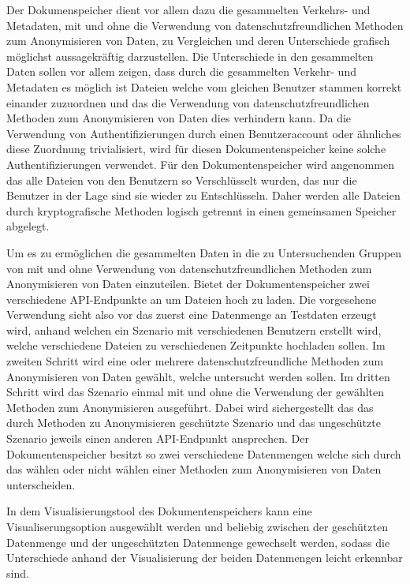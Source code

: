 \documentclass[
    fontsize=12pt,
    headings=small,
    parskip=half,           %
    bibliography=totoc,
    numbers=noenddot,       %
    open=any,               %
    ]{scrreprt}
\begin{document}
Der Dokumenspeicher dient vor allem dazu die gesammelten Verkehrs- und Metadaten, mit und ohne die Verwendung von datenschutzfreundlichen Methoden zum Anonymisieren von Daten, zu Vergleichen und deren Unterschiede grafisch möglichst aussagekräftig darzustellen.
Die Unterschiede in den gesammelten Daten sollen vor allem zeigen, dass durch die gesammelten Verkehr- und Metadaten es möglich ist Dateien welche vom gleichen Benutzer stammen korrekt einander zuzuordnen und das die Verwendung von datenschutzfreundlichen Methoden zum Anonymisieren von Daten dies verhindern kann.
Da die Verwendung von Authentifizierungen durch einen Benutzeraccount oder ähnliches diese Zuordnung trivialisiert, wird für diesen Dokumentenspeicher keine solche Authentifizierungen verwendet. 
Für den Dokumentenspeicher wird angenommen das alle Dateien von den Benutzern so Verschlüsselt wurden, das nur die Benutzer in der Lage sind sie wieder zu Entschlüsseln.
Daher werden alle Dateien durch kryptografische Methoden logisch getrennt in einen gemeinsamen Speicher abgelegt.

Um es zu ermöglichen die gesammelten Daten in die zu Untersuchenden Gruppen von mit und ohne Verwendung von datenschutzfreundlichen Methoden zum Anonymisieren von Daten einzuteilen.
Bietet der Dokumentenspeicher zwei verschiedene API-Endpunkte an um Dateien hoch zu laden.
Die vorgesehene Verwendung sieht also vor das zuerst eine Datenmenge an Testdaten erzeugt wird, anhand welchen ein Szenario mit verschiedenen Benutzern erstellt wird, welche verschiedene Dateien zu verschiedenen Zeitpunkte hochladen sollen. 
Im zweiten Schritt wird eine oder mehrere datenschutzfreundliche Methoden zum Anonymisieren von Daten gewählt, welche untersucht werden sollen.
Im dritten Schritt wird das Szenario einmal mit und ohne die Verwendung der gewählten Methoden zum Anonymisieren ausgeführt. 
Dabei wird sichergestellt das das durch Methoden zu Anonymisieren geschützte Szenario und das ungeschützte Szenario jeweils einen anderen API-Endpunkt ansprechen.
Der Dokumentenspeicher besitzt so zwei verschiedene Datenmengen welche sich durch das wählen oder nicht wählen einer Methoden zum Anonymisieren von Daten unterscheiden.

In dem Visualisierungstool des Dokumentenspeichers kann eine Visualiserungsoption ausgewählt werden und beliebig zwischen der geschützten Datenmenge und der ungeschützten Datenmenge gewechselt werden, sodass die Unterschiede anhand der Visualisierung der beiden Datenmengen leicht erkennbar sind.
\end{document}
